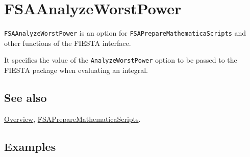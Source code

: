 \documentclass[../FeynHelpersManual.tex]{subfiles}
\begin{document}
\hypertarget{fsaanalyzeworstpower}{
\section{FSAAnalyzeWorstPower}\label{fsaanalyzeworstpower}}

\texttt{FSAAnalyzeWorstPower} is an option for
\texttt{FSAPrepareMathematicaScripts} and other functions of the FIESTA
interface.

It specifies the value of the \texttt{AnalyzeWorstPower} option to be
passed to the FIESTA package when evaluating an integral.

\subsection{See also}

\hyperlink{toc}{Overview},
\hyperlink{fsapreparemathematicascripts}{FSAPrepareMathematicaScripts}.

\subsection{Examples}
\end{document}
